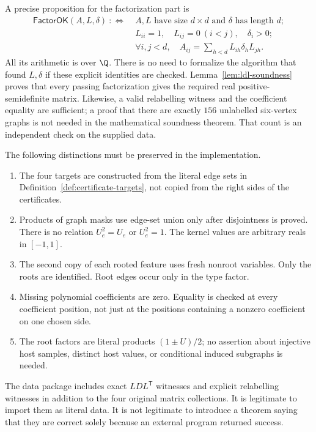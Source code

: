 A precise proposition for the factorization part is
\[
 \begin{aligned}
 \mathsf{FactorOK}(A,L,\delta)\ :\Longleftrightarrow\;&
 \text{$A,L$ have size $d\times d$ and $\delta$ has length $d$};\\[-2pt]
 &L_{ii}=1,\quad L_{ij}=0\ (i<j),\quad\delta_i>0;\\[-2pt]
 &\forall i,j<d,\quad
 A_{ij}=\sum_{h<d}L_{ih}\delta_hL_{jh}.
 \end{aligned}
\]
All its arithmetic is over $\Q$.  There is no need to formalize the algorithm that found
$L,\delta$ if these explicit identities are checked.  Lemma~\ref{lem:ldl-soundness} proves
that every passing factorization gives the required real positive-semidefinite matrix.
Likewise, a valid relabelling witness and the coefficient equality are sufficient; a proof
that there are exactly $156$ unlabelled six-vertex graphs is not needed in the mathematical
soundness theorem.  That count is an independent check on the supplied data.

The following distinctions must be preserved in the implementation.
\begin{enumerate}
\item The four targets are constructed from the literal edge sets in
Definition~\ref{def:certificate-targets}, not copied from the right sides of the certificates.
\item Products of graph masks use edge-set union only after disjointness is proved.
There is no relation $U_e^2=U_e$ or $U_e^2=1$.  The kernel values are arbitrary reals in
$[-1,1]$.
\item The second copy of each rooted feature uses fresh nonroot variables.  Only the roots
are identified.  Root edges occur only in the type factor.
\item Missing polynomial coefficients are zero.  Equality is checked at every coefficient
position, not just at the positions containing a nonzero coefficient on one chosen side.
\item The root factors are literal products $(1\pm U)/2$; no assertion about injective
host samples, distinct host values, or conditional induced subgraphs is needed.
\end{enumerate}

The data package includes exact $LDL^{\mathsf T}$ witnesses and explicit relabelling
witnesses in addition to the four original matrix collections.  It is legitimate to import
them as literal data.  It is not legitimate to introduce a theorem saying that they are
correct solely because an external program returned success.

